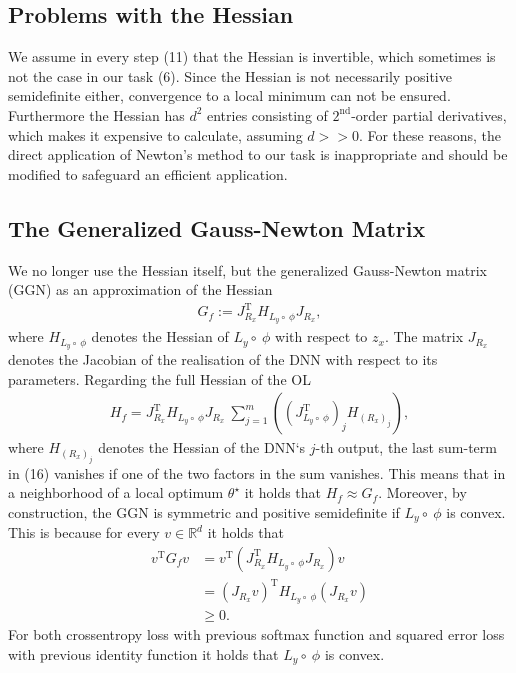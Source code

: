 \documentclass[conference]{IEEEtran}
\begin{document}
	\subsection{Problems with the Hessian}
	\noindent
	We assume in every step (11) that the Hessian is invertible, which sometimes is not the case in our task (6). Since the Hessian is not necessarily positive semidefinite either, convergence to a local minimum can not be ensured. Furthermore the Hessian has $d^{2}$ entries consisting of $2^{\text{nd}}$-order partial derivatives, which makes it expensive to calculate, assuming $d>>0$. For these reasons, the direct application of Newton's method to our task is inappropriate and should be modified to safeguard an efficient application.

	\subsection{The Generalized Gauss-Newton Matrix}
	\noindent
	We no longer use the Hessian itself, but the generalized Gauss-Newton matrix (GGN) as an approximation of the Hessian
	\begin{align}
	G_{f} := J_{R_{x}}^{\mathrm{T}}H_{L_{y}\circ\:\phi}J_{R_{x}},
	\end{align}
	where $H_{L_{y}\circ\:\phi}$ denotes the Hessian of $L_{y}\circ\:\phi$ with respect to $z_{x}$. The matrix $J_{R_{x}}$ denotes the Jacobian of the realisation of the DNN with respect to its parameters.
	Regarding the full Hessian of the OL
	\begin{align}
	H_{f} = J_{R_{x}}^{\mathrm{T}}H_{L_{y}\circ\:\phi}J_{R_{x}}\:\sum_{j = 1}^{m}\left(\left(J_{L_{y}\circ \:\phi}^{\mathrm{T}}\right)_{j} H_{(R_{x})_{j}}\right),
	\end{align}
	where $H_{(R_{x})_{j}}$ denotes the Hessian of the DNN`s  $j$-th output, the last sum-term in (16) vanishes if one of the two factors in the sum vanishes.
	This means that in a neighborhood of a local optimum $\theta^{\star}$ it holds that $H_{f} \approx G_{f}$.   Moreover, by construction, the GGN is symmetric and positive semidefinite if $L_{y}\circ\:\phi$ is convex. This is because for every $v\in\mathbb{R}^{d}$ it holds that
	\begin{align}
	v^{\mathrm{T}}G_{f}v &= v^{\mathrm{T}}\left( J_{R_{x}}^{\mathrm{T}}H_{L_{y}\circ\:\phi}J_{R_{x}}\right)v\\
	&= \left(J_{R_{x}}v\right)^{\mathrm{T}}H_{L_{y}\circ\:\phi}\left(J_{R_{x}}v\right) \\
	&\geq 0.
	\end{align}
	For both crossentropy loss with previous softmax function and squared error loss with previous identity function it holds that $L_{y}\circ\:\phi$ is convex.
\end{document}
